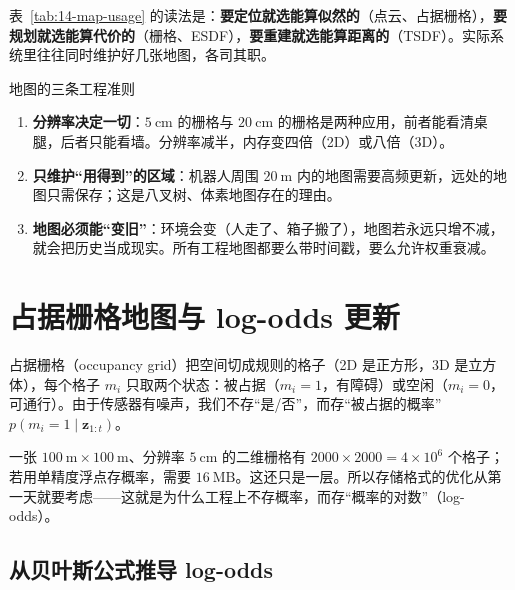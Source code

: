 表~\ref{tab:14-map-usage} 的读法是：\textbf{要定位就选能算似然的}（点云、占据栅格），\textbf{要规划就选能算代价的}（栅格、ESDF），\textbf{要重建就选能算距离的}（TSDF）。实际系统里往往同时维护好几张地图，各司其职。

\begin{keybox}{地图的三条工程准则}
\begin{enumerate}
  \item \textbf{分辨率决定一切}：$5\ \mathrm{cm}$ 的栅格与 $20\ \mathrm{cm}$ 的栅格是两种应用，前者能看清桌腿，后者只能看墙。分辨率减半，内存变四倍（2D）或八倍（3D）。
  \item \textbf{只维护``用得到''的区域}：机器人周围 $20\ \mathrm{m}$ 内的地图需要高频更新，远处的地图只需保存；这是八叉树、体素地图存在的理由。
  \item \textbf{地图必须能``变旧''}：环境会变（人走了、箱子搬了），地图若永远只增不减，就会把历史当成现实。所有工程地图都要么带时间戳，要么允许权重衰减。
\end{enumerate}
\end{keybox}

\section{占据栅格地图与 log-odds 更新}\label{sec:14-occupancy}

\begin{definition}[占据栅格]
占据栅格（occupancy grid）把空间切成规则的格子（2D 是正方形，3D 是立方体），每个格子 $m_i$ 只取两个状态：被占据（$m_i=1$，有障碍）或空闲（$m_i=0$，可通行）。由于传感器有噪声，我们不存``是/否''，而存``被占据的概率'' $p(m_i=1\mid \bm{z}_{1:t})$。
\end{definition}

一张 $100\ \mathrm{m}\times100\ \mathrm{m}$、分辨率 $5\ \mathrm{cm}$ 的二维栅格有 $2000\times2000=4\times10^{6}$ 个格子；若用单精度浮点存概率，需要 $16\ \mathrm{MB}$。这还只是一层。所以存储格式的优化从第一天就要考虑——这就是为什么工程上不存概率，而存``概率的对数''（log-odds）。

\subsection{从贝叶斯公式推导 log-odds}

